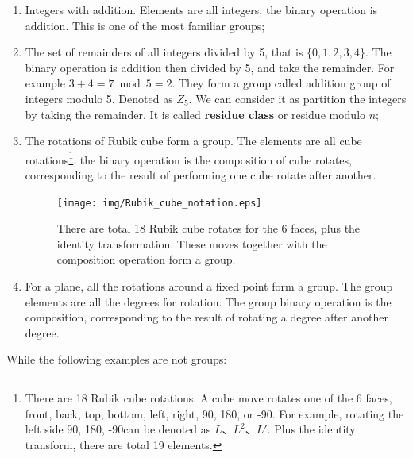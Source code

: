 \documentclass{article}
\begin{document}
\begin{enumerate}
\item Integers with addition. Elements are all integers, the binary operation is addition. This is one of the most familiar groups;

\item The set of remainders of all integers divided by 5, that is $\{0, 1, 2, 3, 4\}$. The binary operation is addition then divided by 5, and take the remainder. For example $3 + 4 = 7 \bmod 5 = 2$. They form a group called addition group of integers modulo 5. Denoted as $Z_5$. We can consider it as partition the integers by taking the remainder. It is called \textbf{residue class} or residue modulo $n$;

\item The rotations of Rubik cube form a group. The elements are all cube rotations\footnote{There are 18 Rubik cube rotations. A cube move rotates one of the 6 faces, front, back, top, bottom, left, right, 90\degree, 180\degree, or -90\degree. For example, rotating the left side 90\degree, 180\degree, -90\degree can be denoted as $L$、$L^2$、$L'$\cite{Wiki-Rubik-Cube-group}. Plus the identity transform, there are total 19 elements.}, the binary operation is the composition of cube rotates, corresponding to the result of performing one cube rotate after another.

\begin{figure}[htbp]
 \centering
 \texttt{[image: img/Rubik\_cube\_notation.eps]}
 \caption{There are total 18 Rubik cube rotates for the 6 faces, plus the identity transformation. These moves together with the composition operation form a group.}
 \label{fig:Rubik-cube-notation}
\end{figure}

\item For a plane, all the rotations around a fixed point form a group. The group elements are all the degrees for rotation. The group binary operation is the composition, corresponding to the result of rotating a degree after another degree.
\end{enumerate}

While the following examples are not groups:
\end{document}

